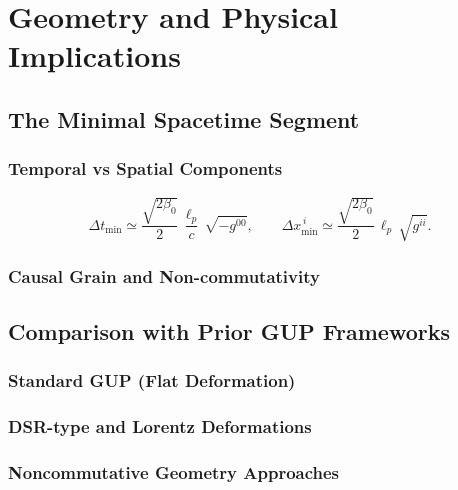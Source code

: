 \documentclass[11pt,oneside]{book}
\numberwithin{equation}{chapter}
\newcommand{\lp}{\ell_p}             %
\newcommand{\betaz}{\beta_0}
\begin{document}
\part{Geometry and Physical Implications}

\chapter{The Minimal Spacetime Segment}
\section{Temporal vs Spatial Components}
\begin{equation}
\Delta t_{\min} \simeq \frac{\sqrt{2\betaz}}{2}\,\frac{\lp}{c}\,\sqrt{-g^{00}},\qquad
\Delta x_{\min}^{\,i}\simeq \frac{\sqrt{2\betaz}}{2}\,\lp\,\sqrt{g^{ii}}.
\end{equation}
\section{Causal Grain and Non-commutativity}

\chapter{Comparison with Prior GUP Frameworks}
\section{Standard GUP (Flat Deformation)}
\section{DSR-type and Lorentz Deformations}
\section{Noncommutative Geometry Approaches}
\end{document}
